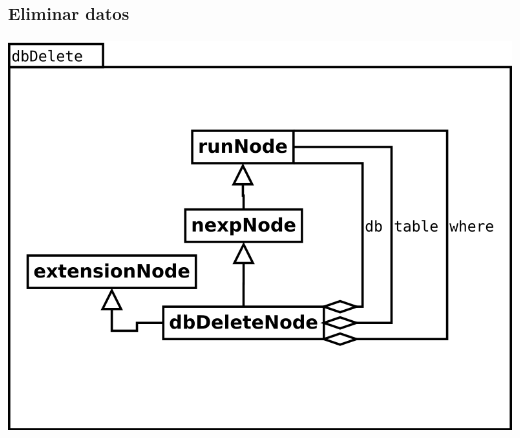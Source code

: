 \subsubsection {Eliminar datos}
\begin{center}
\includegraphics[scale=0.4]{dbDelete.png} \\
\end{center}

